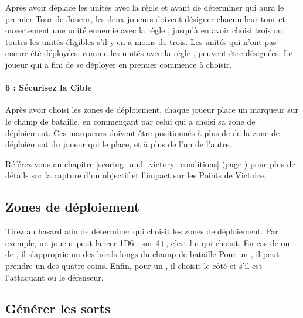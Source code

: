 \newline
Après avoir déplacé les unités avec la règle \vanguard{} et avant de déterminer qui aura le premier Tour de Joueur, les deux joueurs doivent désigner chacun leur tour et ouvertement une unité ennemie avec la règle \scoring{}, jusqu'à en avoir choisi trois ou toutes les unités éligibles s'il y en a moins de trois. Les unités qui n'ont pas encore été déployées, comme les unités avec la règle \ambush{}, peuvent être désignées. Le joueur qui a fini de se déployer en premier commence à choisir.

\paragraph{6 : Sécurisez la Cible}

\newline
Après avoir choisi les zones de déploiement, chaque joueur place un marqueur sur le champ de bataille, en commençant par celui qui a choisi sa zone de déploiement. Ces marqueurs doivent être positionnés à plus de  de la zone de déploiement du joueur qui le place, et à plus de  l'un de l'autre.

Référez-vous au chapitre \ref{scoring_and_victory_conditions} (page \pageref{scoring_and_victory_conditions}) pour plus de détails sur la capture d'un objectif et l'impact sur les Points de Victoire.

\hypertarget{deploymentzones}{\subsection{Zones de déploiement}}

Tirez au hasard afin de déterminer qui choisit les zones de déploiement. Par exemple, un joueur peut lancer 1D6 : sur 4+, c'est lui qui choisit. En cas de \frontlineclash{} ou de \counterthrust{}, il s'approprie un des bords longs du champ de bataille Pour un , il peut prendre un des quatre coins. Enfin, pour un \encircle{}, il choisit le côté et s'il est l'attaquant ou le défenseur.

\newpage
\hypertarget{generatespells}{\subsection{Générer les sorts}}
\label{generating_spells}

